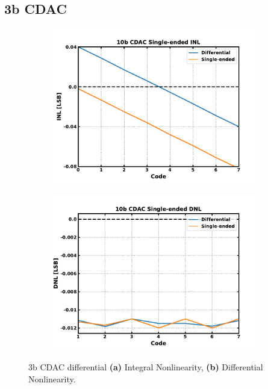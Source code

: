 \FloatBarrier\pagebreak
\subsection{3b CDAC}

	\begin{figure}[htb!]
	    \centering
	    \begin{subfigure}{0.5\textwidth}
	        \centering
	        \includegraphics[width=1\textwidth, angle=0]{./figs/results/cdac_3b_inl}
	        \caption{ }
	        \label{fig:cdac_3b_inl}
	    \end{subfigure}%
	    \begin{subfigure}{0.5\textwidth}
	        \centering
	        \includegraphics[width=1\textwidth, angle=0]{./figs/results/cdac_3b_dnl}
	        \caption{ }
	        \label{fig:cdac_3b_dnl}
	    \end{subfigure}
	    \label{fig:3b_cdac_nonlinearity}
	    \caption{3b CDAC differential \textbf{(a)} Integral Nonlinearity, \textbf{(b)} Differential Nonlinearity.}
	\end{figure} 


